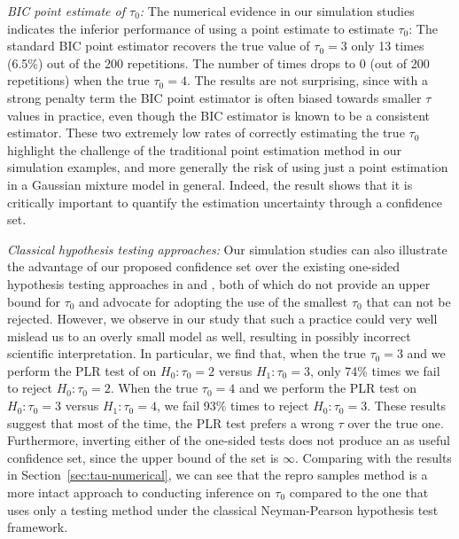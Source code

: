 \documentclass[12pt]{article}
\theoremstyle{shortspace}
\begin{document}
{\it BIC point estimate of $\tau_0$:} The numerical evidence in our simulation studies indicates the inferior performance of using a point estimate to estimate $\tau_0$:
The standard BIC point estimator recovers the true value of $\tau_0 = 3$ only 13 times (6.5\%) out of the 200 repetitions.  
The number of times 
drops to $0$ (out of 200 repetitions) when the true $\tau_0=4.$ The results are not surprising, since with a strong penalty term the BIC point estimator is often biased towards smaller $\tau$ values in practice, even though the BIC estimator is known to be a consistent estimator. 
These two extremely low rates of correctly estimating the true $\tau_0$ highlight the challenge of the traditional point estimation method in our simulation examples, and more generally the risk of using just a point estimation in a Gaussian mixture model in general. Indeed, the result shows that it is critically important to quantify the estimation uncertainty through a confidence set.



{\it Classical hypothesis testing approaches:}
Our simulation studies can also illustrate the advantage of our proposed confidence set over the existing one-sided hypothesis testing approaches in \cite{roeder_graphical_1994} and \cite{chen_inference_2012},  both of which 
do not provide an upper bound for $\tau_0$ and 
advocate for adopting 
the use of the smallest $\tau_0$ that can not be rejected. 
However, we observe in our study that such a practice could very well mislead us to an overly small model as well, resulting in possibly incorrect scientific interpretation. In particular, we find that, when the true $\tau_0=3$ and we perform the PLR test of \cite{chen_inference_2012} on $H_0: \tau_0=2$ versus 
$H_1: \tau_0 = 3$,
only 74\% times we fail to reject $H_0: \tau_0=2$. When the true $\tau_0=4$ and we perform the PLR test on $H_0: \tau_0=3$ versus $H_1: \tau_0 = 4$,
we fail 93\% times to reject $H_0: \tau_0=3$. These results suggest that most of the time, the PLR test prefers a wrong $\tau$ over the true one. Furthermore, inverting either of the one-sided tests does not produce an as useful confidence set, since the upper bound of the set is $\infty$. Comparing with the results in Section~\ref{sec:tau-numerical}, 
we can see that the repro samples method is a more intact approach to conducting inference on $\tau_0$ compared to the one that uses only a testing method under the classical Neyman-Pearson hypothesis test framework. 
\end{document}
